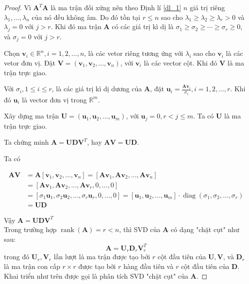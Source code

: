 \documentclass[14pt,oneside,a4paper]{report}
\numberwithin{equation}{section}
\begin{document}
\begin{proof}
Vì $\mathbf{A}^{T} \mathbf{A}$ là ma trận đối xứng nên theo Định lí \ref{dl_1} $n$ giá trị riêng $\lambda_{1}, \ldots, \lambda_{n}$ của nó đều không âm. Do đó tồn tại $r \leqslant n$ sao cho $\lambda_{1} \geqslant \lambda_{2} \geqslant \lambda_{r}>0$ và $\lambda_{j}=0$ với $j>r$. Khi đó ma trận $\mathbf{A}$ có các giá trị kì dị là $\sigma_{1} \geqslant \sigma_{2} \geqslant \cdots \geqslant \sigma_{r} \geqslant 0$, và $\sigma_{j}=0$ với $j>r$.

Chọn $\mathbf{v}_{i} \in \mathbb{R}^{n}, i=1,2, \ldots, n$, là các vetor riêng tương ứng với $\lambda_{i}$ sao cho $\mathbf{v}_{i}$ là các vetor đơn vị. Đặt $\mathbf{V}=\left(\mathbf{v}_{1}, \mathbf{v}_{2}, \ldots, \mathbf{v}_{n}\right)$, với $\mathbf{v}_{i}$ là các vector cột. Khi đó $\mathbf{V}$ là ma trận trực giao.

Với $\sigma_{i}, 1 \leqslant i \leqslant r$, là các giá trị kì dị dương của $\mathbf{A}$, đặt $\mathbf{u}_{i}=\frac{\mathbf{A v}_{i}}{\sigma_{i}}, i=1,2, \ldots, r$. Khi đó $\mathbf{u}_{i}$ là vector đơn vị trong $\mathbb{R}^{m}$.

Xây dựng ma trận $\mathbf{U}=\left(\mathbf{u}_{1}, \mathbf{u}_{2}, \ldots, \mathbf{u}_{m}\right)$, với $\mathbf{u}_{j}=0, r<j \leqslant m$. Ta có $\mathbf{U}$ là ma trận trực giao.

Ta chứng minh $\mathbf{A}=\mathbf{U D V}^{T}$, hay $\mathbf{A V}=\mathbf{U D}$.

Ta có

$$
\begin{aligned}
	\mathbf{A} \mathbf{V} & =\mathbf{A}\left[\mathbf{v}_{1}, \mathbf{v}_{2}, \ldots, \mathbf{v}_{n}\right]=\left[\mathbf{A v}_{1}, \mathbf{A v}_{2}, \ldots, \mathbf{A} \mathbf{v}_{n}\right]\\
	&=\left[\mathbf{A v}_{1}, \mathbf{A v}_{2}, \ldots, \mathbf{A v}_{r}, 0, \ldots, 0\right] \\
	& =\left[\sigma_{1} \mathbf{u}_{1}, \sigma_{2} \mathbf{u}_{2}, \ldots, \sigma_{r} \mathbf{u}_{r}, 0, \ldots, 0\right]=\left[\mathbf{u}_{1}, \mathbf{u}_{2}, \ldots, \mathbf{u}_{m}\right] \cdot \operatorname{diag}\left(\sigma_{1}, \sigma_{2}, \ldots, \sigma_{r}\right) \\
	& =\mathbf{U D}
\end{aligned}
$$

Vậy $\mathbf{A}=\mathbf{U D V}^{T}$\\%
Trong trường hợp $\operatorname{rank}(\mathbf{A})=r<n$, thì SVD của $\mathbf{A}$ có dạng "chặt cụt" như sau:
$$
\mathbf{A}=\mathbf{U}_r \mathbf{D}_r \mathbf{V}_r^T
$$
trong đó $\mathbf{U}_r, \mathbf{V}_r$ lần lượt là ma trận được tạo bởi $r$ cột đầu tiên của $\mathbf{U}, \mathbf{V}$, và $\mathbf{D}_r$ là ma trận con cấp $r \times r$ được tạo bởi $r$ hàng đầu tiên và $r$ cột đầu tiên của $\mathbf{D}$. Khai triển
như trên được gọi là phân tích SVD "chặt cụt" của $\mathbf{A}$.
\end{proof}
\end{document}
